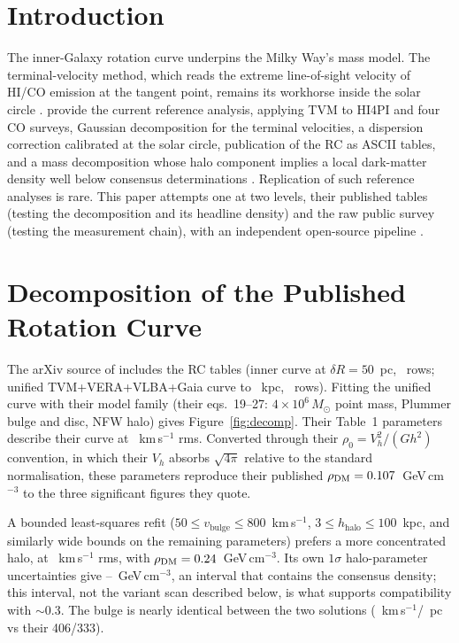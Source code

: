 \documentclass[twocolumn]{aastex631}
\begin{document}
\section{Introduction}
The inner-Galaxy rotation curve underpins the Milky Way's mass model. The terminal-velocity
method, which reads the extreme line-of-sight velocity of HI/CO emission at the tangent
point, remains its workhorse inside the solar circle \citep{mcclure2016,chemin2015}.
\citet{sofue2025} provide the current reference analysis, applying TVM to HI4PI
\citep{hi4pi} and four CO surveys, Gaussian decomposition for the terminal velocities, a
dispersion correction calibrated at the solar circle, publication of the RC as ASCII tables,
and a mass decomposition whose halo component implies a local dark-matter density well below
consensus determinations \citep{readdm}. Replication of such reference analyses is rare.
This paper attempts one at two levels, their published tables (testing the decomposition and
its headline density) and the raw public survey (testing the measurement chain), with an
independent open-source pipeline \citep{janskyresearch}.

\section{Decomposition of the Published Rotation Curve}
The arXiv source of \citet{sofue2025} includes the RC tables (inner curve at
$\delta R = 50$~pc, \irInnerRows\ rows; unified TVM+VERA+VLBA+Gaia curve to
\irRmax~kpc, \irUniRows\ rows). Fitting the unified curve with their model family (their
eqs.~19--27: $4\times10^{6}\,M_\odot$ point mass, Plummer bulge and disc, NFW halo) gives
Figure~\ref{fig:decomp}. Their Table~1 parameters describe their curve at
\irRmsTheirs~km\,s$^{-1}$ rms. Converted through their $\rho_0 = V_h^2/(G h^2)$ convention,
in which their $V_h$ absorbs $\sqrt{4\pi}$ relative to the standard normalisation, these
parameters reproduce their published $\rho_\mathrm{DM} = 0.107$~GeV\,cm$^{-3}$ to the
three significant figures they quote.

A bounded least-squares refit ($50 \le v_\mathrm{bulge} \le 800$~km\,s$^{-1}$,
$3 \le h_\mathrm{halo} \le 100$~kpc, and similarly wide bounds on the remaining parameters)
prefers a more concentrated halo, at \irRmsOurs~km\,s$^{-1}$ rms, with
$\rho_\mathrm{DM} = 0.24$~GeV\,cm$^{-3}$. Its own $1\sigma$ halo-parameter
uncertainties give \irRhoLo--\irRhoHi~GeV\,cm$^{-3}$, an interval that contains the
consensus density; this interval, not the variant scan described below, is what supports
compatibility with $\sim$0.3. The bulge is nearly identical between the two solutions
(\irVBulgeOurs~km\,s$^{-1}$/\irABulgeOurs~pc vs their 406/333).
\end{document}
